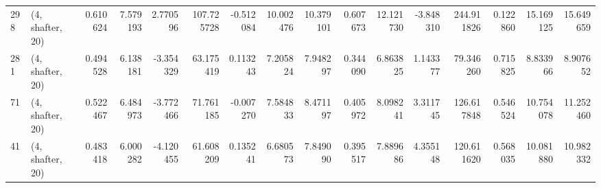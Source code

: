 \begin{tabular}{llrrrrrrrrrrrrrr}
298 &  (4, shafter, 20) &   0.610624 &   7.579193 &   2.770596 &   107.725728 &  -0.512084 &  10.002476 &  10.379101 &  0.607673 &  12.121730 &  -3.848310 &   244.911826 &   0.122860 &  15.169125 &  15.649659 \\
281 &  (4, shafter, 20) &   0.494528 &   6.138181 &  -3.354329 &    63.175419 &   0.113243 &   7.205824 &   7.948297 &  0.344090 &   6.863825 &   1.143377 &    79.346260 &   0.715825 &   8.833966 &   8.907652 \\
71  &  (4, shafter, 20) &   0.522467 &   6.484973 &  -3.772466 &    71.761185 &  -0.007270 &   7.584833 &   8.471197 &  0.405972 &   8.098241 &   3.311745 &   126.617848 &   0.546524 &  10.754078 &  11.252460 \\
41  &  (4, shafter, 20) &   0.483418 &   6.000282 &  -4.120455 &    61.608209 &   0.135241 &   6.680573 &   7.849090 &  0.395517 &   7.889686 &   4.355148 &   120.611620 &   0.568035 &  10.081880 &  10.982332 \\
\bottomrule
\end{tabular}
